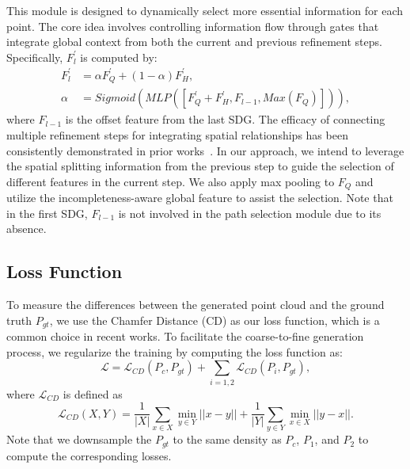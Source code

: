 This module is designed to dynamically select more essential information for each point. The core idea involves controlling information flow through gates that integrate global context from both the current and previous refinement steps.
Specifically, $F_{l}^{\prime}$ is computed by:
\begin{equation} \label{eqn3}
  \begin{split}
   F_{l}^{\prime} &= \alpha F_{Q}^{\prime} + (1-\alpha) F_{H}^{\prime},\\
   \alpha &= Sigmoid(MLP([F_{Q}^{\prime}+F_{H}^{\prime},F_{l-1},Max(F_Q)])),
  \end{split}
\end{equation}
where $F_{l-1}$ is the offset feature from the last SDG.
The efficacy of connecting multiple refinement steps for integrating spatial relationships has been consistently demonstrated in prior works~\citep{9928787,zhou2022seedformer,yan2022fbnet}. In our approach, we intend to leverage the spatial splitting information from the previous step to guide the selection of different features in the current step.
We also apply max pooling to $F_Q$ and utilize the incompleteness-aware global feature to assist the selection.
Note that in the first SDG, $F_{l-1}$ is not involved in the path selection module due to its absence.

\subsection{Loss Function}
To measure the differences between the generated point cloud and the ground truth $P_{gt}$, we use the Chamfer Distance (CD) as our loss function, which is a common choice in recent works. 
To facilitate the coarse-to-fine generation process, we regularize the training by computing the loss function as:
\begin{equation} \label{eqnloss}
    \mathcal{L}= \mathcal{L}_{CD}(P_c,P_{gt}) + \sum_{i = {1,2}}\mathcal{L}_{CD}(P_i,P_{gt}),
\end{equation}
where $\mathcal{L}_{CD}$ is defined as
\begin{equation}\label{eqnCD}
    \mathcal{L}_{CD}(X,Y)=\frac{1}{\lvert X \rvert}\sum_{x \in X}\min_{y \in Y} \lvert \lvert x-y \rvert \rvert + \frac{1}{\lvert Y \rvert}\sum_{y \in Y}\min_{x \in X} \lvert \lvert y-x \rvert \rvert.
\end{equation}
Note that we downsample the $P_{gt}$ to the same density as $P_c$, $P_1$, and $P_2$ to compute the corresponding losses. 

